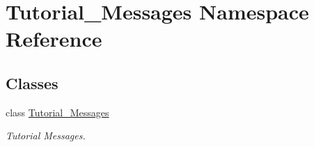 \hypertarget{namespaceTutorial__Messages}{}\section{Tutorial\+\_\+\+Messages Namespace Reference}
\label{namespaceTutorial__Messages}
\subsection*{Classes}
\begin{DoxyCompactItemize}
\item 
class \hyperlink{classTutorial__Messages_1_1Tutorial__Messages}{Tutorial\+\_\+\+Messages}
\begin{DoxyCompactList}\small\item\em Tutorial Messages. \end{DoxyCompactList}\end{DoxyCompactItemize}
